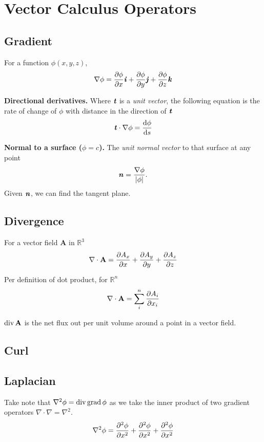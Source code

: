 \section{Vector Calculus Operators}

\subsection*{Gradient}
For a function $\phi(x, y, z)$,
\begin{equation*}
    \nabla \phi = \pdv{\phi}{x} \textbf{\textit{i}} + \pdv{\phi}{y} \textbf{\textit{j}} + \pdv{\phi}{z} \textbf{\textit{k}}
\end{equation*}

\textbf{Directional derivatives.} Where $\textbf{\textit{t}}$ is a \textit{unit vector},
the following equation is the rate of change of $\phi$ with distance in the direction of $\textbf{\textit{t}}$
\begin{equation*}
    \textbf{\textit{t}} \cdot \nabla \phi = \odv{\phi}{s}
\end{equation*}

\textbf{Normal to a surface ($\phi = c$).} The \textit{unit normal vector} to that surface at any point
\begin{equation*}
    \textbf{\textit{n}} = \frac{\nabla \phi}{|\phi|}.
\end{equation*}
Given $\textbf{\textit{n}}$, we can find the tangent plane.
\subsection*{Divergence}
For a vector field $\mathbf{A}$ in $\mathbb{R}^3$
\begin{equation*}
    \nabla \cdot \mathbf{A} = \pdv{A_x}{x} + \smash{\pdv{A_y}{y}}+ \pdv{A_z}{z}
\end{equation*}

Per definition of dot product, for $\mathbb{R}^n$
\begin{equation*}
    \nabla \cdot \mathbf{A} = \sum_{i}^{n} \pdv{A_i}{x_i}
\end{equation*}

$\operatorname{div} \mathbf{A}$ is the net flux out per unit volume around a point in a vector field.

\subsection*{Curl}

\subsection*{Laplacian}
Take note that $\nabla^2 \phi = \operatorname{div} \operatorname{grad} \phi$ as we take the inner product of two gradient operators $\nabla \cdot \nabla = \nabla^2$.
\begin{equation*}
    \nabla^2 \phi =  \pdv[order=2]{\phi}{x} + \pdv[order=2]{\phi}{x} + \pdv[order=2]{\phi}{x}
\end{equation*}


